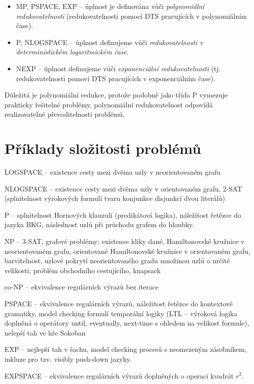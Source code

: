 \documentclass[a4paper, 11pt]{report}
\begin{document}
\begin{itemize}
	\item MP, PSPACE, EXP -- úplnost je definována vůči \emph{polynomiální redukovatelnosti} (redukovatelnosti pomocí DTS pracujících v polynomiálním čase).
	\item P, NLOGSPACE -- úplnost definujeme vůči \emph{redukovatelnosti v deterministickém logaritmickém čase}.
	\item NEXP -- úplnost definujeme vůči \emph{exponenciální redukovatelnosti} (tj. redukovatelnosti pomocí DTS pracujících v exponenciálním čase).
\end{itemize}

Důležitá je polynomiální redukce, protože podobně jako třída P vymezuje prakticky řešitelné problémy, polynomiální redukovatelnost odpovídá realizovatelné převoditelnosti problémů.

\section{Příklady složitosti problémů}

LOGSPACE -- existence cesty mezi dvěma uzly v neorientovaném grafu

NLOGSPACE -- existence cesty mezi dvěma uzly v orientovaném grafu, 2-SAT (splnitelnost výrokových formulí tvaru konjunkce disjunkcí dvou literálů)

P -- splnitelnost Hornových klauzulí (predikátová logika), náležitost řetězce do jazyka BKG, následnost uzlů při průchodu grafem do hloubky.

NP -- 3-SAT, grafové problémy: existence kliky dané, Hamiltonovské kružnice v neorientovaném grafu, orientované Hamiltonovské kružnice v orientovaném grafu, barvitelnost, uzlové pokrytí neorientovaného gradu množinou uzlů o určité velikosti; problém obchodního cestujícího, knapsack

co-NP -- ekvivalence regulárních výrazů bez iterace

PSPACE -- ekvivalence regulárních výrazů, náležitost řetězce do kontextové gramatiky, model checking formulí temporální logiky (LTL -- výroková logika doplněná o operátory until, eventually, next-time s ohledem na velikost formule), nelepší tah ve hře Sokoban

EXP -- nejlepší tah v šachu, model checking procesů s neomezeným zásobníkem, inkluze pro tzv. visibly push-down jazyky.

EXPSPACE -- ekvivalence regulárních výrazů doplněných o operaci kvadrát $r^2$.
\end{document}
